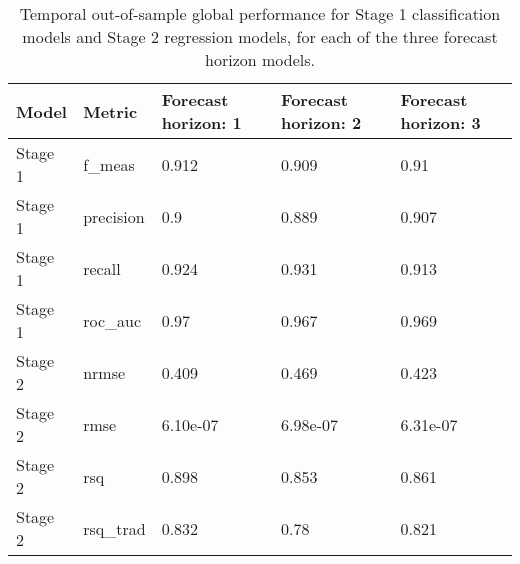 \begin{table}[ht]
\centering
\caption{Temporal out-of-sample global performance for Stage 1 classification models and Stage 2 regression models, for each of the three forecast horizon models.} 
\label{tab:table_performance_stages_combined}
\begin{tabular}{lllll}
  \hline
Model & Metric & Forecast horizon: 1 & Forecast horizon: 2 & Forecast horizon: 3 \\ 
  \hline
Stage 1 & f\_meas & 0.912 & 0.909 & 0.91 \\ 
  Stage 1 & precision & 0.9 & 0.889 & 0.907 \\ 
  Stage 1 & recall & 0.924 & 0.931 & 0.913 \\ 
  Stage 1 & roc\_auc & 0.97 & 0.967 & 0.969 \\ 
  Stage 2 & nrmse & 0.409 & 0.469 & 0.423 \\ 
  Stage 2 & rmse & 6.10e-07 & 6.98e-07 & 6.31e-07 \\ 
  Stage 2 & rsq & 0.898 & 0.853 & 0.861 \\ 
  Stage 2 & rsq\_trad & 0.832 & 0.78 & 0.821 \\ 
   \hline
\end{tabular}
\end{table}
